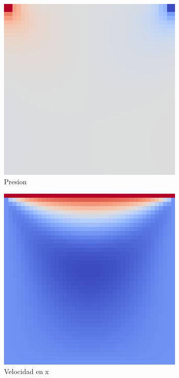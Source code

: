 ~\\
\begin{figure}[!htbp]
\centering
\begin{subfigure}{.3\textwidth}
  \centering
  \includegraphics[width=.8\linewidth]{imagenes/small_p.png}
  \caption{Presion}
  \label{fig:sub1}
\end{subfigure}%
\begin{subfigure}{.3\textwidth}
  \centering
  \includegraphics[width=.8\linewidth]{imagenes/small_u.png}
  \caption{Velocidad en x}
  \label{fig:sub2}
\end{subfigure}
\begin{subfigure}{.3\textwidth}

\end{subfigure}
\end{figure}
